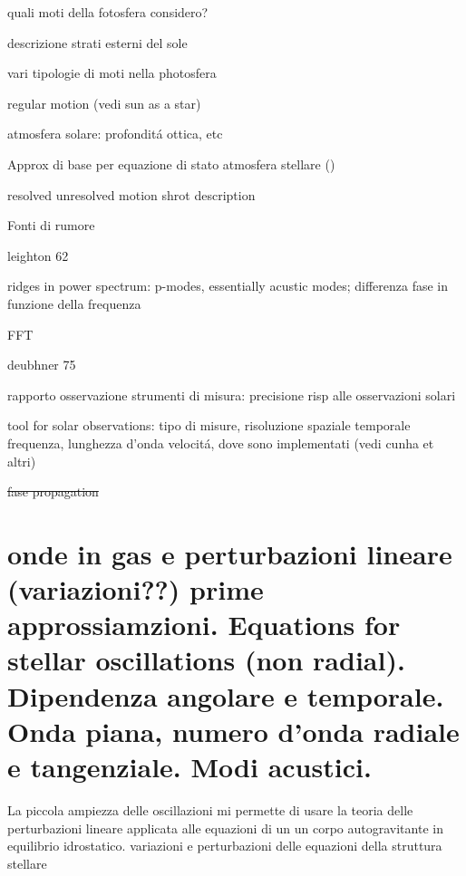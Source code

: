 \begin{itemize*}
\item quali moti della fotosfera considero?
\item descrizione strati esterni del sole
\item vari tipologie di moti nella photosfera
\item regular motion (vedi sun as a star)
\item atmosfera solare: profondit\'a ottica, etc
\item Approx di base per equazione di stato atmosfera stellare (\cite{ste74waves})
\item resolved unresolved motion shrot description
\item Fonti di rumore
\item leighton 62 \cite{lei62velocity}
\item ridges in power spectrum: p-modes, essentially acustic modes; differenza fase in funzione della frequenza
\item FFT
\item deubhner 75 \cite{deu75observations}
\item rapporto osservazione strumenti di misura: precisione risp alle osservazioni solari
\item tool for solar observations: tipo di misure, risoluzione spaziale temporale frequenza, lunghezza d'onda velocit\'a, dove sono implementati (vedi cunha et altri)

\item \sout{fase propagation}
\end{itemize*}

\printbibliography[heading=subbibintoc]


\section{onde in gas e perturbazioni lineare (variazioni??) prime approssiamzioni. Equations for stellar oscillations (non radial). Dipendenza angolare e temporale. Onda piana, numero d'onda radiale e tangenziale. Modi acustici.}

La piccola ampiezza delle oscillazioni mi permette di usare la teoria delle perturbazioni lineare applicata alle equazioni di un un corpo autogravitante in equilibrio idrostatico. variazioni e perturbazioni delle equazioni della struttura stellare

